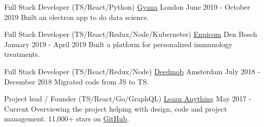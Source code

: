 
\begin{cventries}

  \cventry
    {Full Stack Developer (TS/React/Python)}
    {\href{https://www.gyana.co.uk}{Gyana}}
    {London}
    {June 2019 - October 2019}
    {
      {Built an electron app to do data science.}
    }

  \cventry
    {Full Stack Developer (TS/React/Redux/Node/Kubernetes)}
    {\href{https://www.enpicom.com}{Enpicom}}
    {Den Bosch}
    {January 2019 - April 2019}
    {
      {Built a platform for personalized immunology treatments.}
    }

  \cventry
    {Full Stack Developer (TS/React/Redux/Node)}
    {\href{https://www.deedmob.com}{Deedmob}}
    {Amsterdam}
    {July 2018 - December 2018}
    {
      {Migrated code from JS to TS.}
    }

  \cventry
    {Project lead / Founder (TS/React/Go/GraphQL)}
    {\href{https://learn-anything.xyz}{Learn Anything}}
    {}
    {May 2017 - Current}
    {
      {Overviewing the project helping with design, code and project management. 11,000+ stars on \href{https://github.com/learn-anything/learn-anything}{GitHub}.}
    }

\end{cventries}
